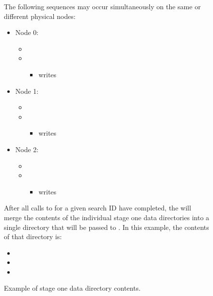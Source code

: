 \begin{figure}
\begin{framed}
	The following sequences may occur simultaneously on the same or
	different physical nodes:\vspace{1ex}
	\begin{itemize}
		\item Node 0:
			\begin{itemize}
				\item {}
				\item {}
				\begin{itemize}
					\item \implementation writes %
				\end{itemize}
			\end{itemize}
		\item Node 1:
			\begin{itemize}
				\item {}
				\item {}
				\begin{itemize}
					\item \implementation writes %
				\end{itemize}
			\end{itemize}
		\item Node 2:
			\begin{itemize}
				\item {}
				\item {}
				\begin{itemize}
					\item \implementation writes %
				\end{itemize}
			\end{itemize}
	\end{itemize}

	\vspace{1ex}
	After all calls to  for a given search
	ID have completed, the \testdriver will merge the contents of the
	individual stage one data directories into a single directory that will
	be passed to . In this example, the
	contents of that directory is:
	\begin{itemize}
		\item {}
		\item {}
		\item {}
	\end{itemize}

\end{framed}
\captionsetup{font=footnotesize}
\caption{Example of stage one data directory contents.}
\label{fig:api-stageone-example}
\end{figure}


